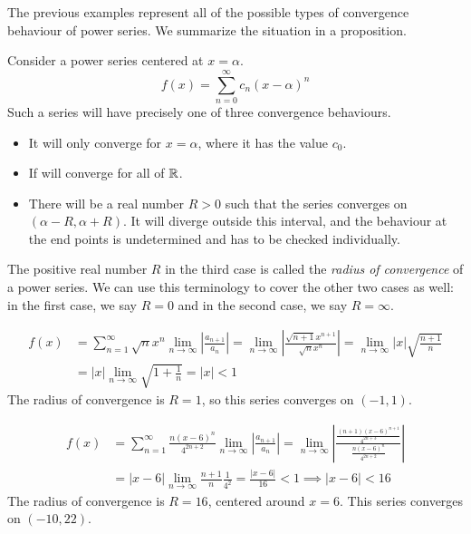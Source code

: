 \documentclass[fleqn]{report}
\begin{document}
The previous examples represent all of the possible types of
convergence behaviour of power series. We summarize the
situation in a proposition.

\begin{prop}
Consider a power series centered at $x = \alpha$.
\begin{equation*}
f(x) = \sum_{n=0}^\infty c_n (x-\alpha)^n
\end{equation*}
Such a series will have precisely one of three convergence
behaviours.
\begin{itemize}
\item It will only converge for $x = \alpha$, where it has the
value $c_0$. 
\item If will converge for all of $\mathbb{R}$.
\item There will be a real number $R>0$ such that the series
converges on $(\alpha - R, \alpha + R)$. It will diverge
outside this interval, and the behaviour at the end points is
undetermined and has to be checked individually.
\end{itemize}
\end{prop}

\begin{defn} 
The positive real number $R$ in the third case is called the
\emph{radius of convergence} of a power series. We can use
this terminology to cover the other two cases as well: in the
first case, we say $R=0$ and in the second case, we say $R =
\infty$. 
\end{defn}

\begin{example}
\begin{align*}
f(x) & = \sum_{n=1}^\infty \sqrt{n} x^n 
\lim_{n \rightarrow \infty} \left| \frac{a_{n+1}}{a_n} \right| = 
\lim_{n \rightarrow \infty} 
\left| \frac{\sqrt{n+1}x^{n+1}}{\sqrt{n} x^n} \right| 
= \lim_{n \rightarrow \infty} |x| \sqrt{\frac{n+1}{n}} \\
& = |x| \lim_{n \rightarrow \infty} \sqrt{ 1 + \frac{1}{n} } =
|x| < 1
\end{align*}
The radius of convergence is $R=1$, so this series converges on $(-1,1)$.
\end{example}

\begin{example}
\begin{align*}
f(x) & = \sum_{n=1}^\infty \frac{n(x-6)^n}{4^{2n+2}}
\lim_{n \rightarrow \infty} \left| \frac{a_{n+1}}{a_n} \right| = 
\lim_{n \rightarrow \infty} \left|
\frac{\frac{(n+1)(x-6)^{n+1}}{4^{2n+3}}}{\frac{n(x-6)^n}{4^{2n+2}}}
\right|
\\
& = |x-6| \lim_{n \rightarrow \infty} \frac{n+1}{n}
\frac{1}{4^2} = \frac{|x-6|}{16} < 1 \implies
|x-6| < 16
\end{align*}
The radius of convergence is $R=16$, centered around
$x=6$. This series converges on $(-10, 22)$.
\end{example}
\end{document}
